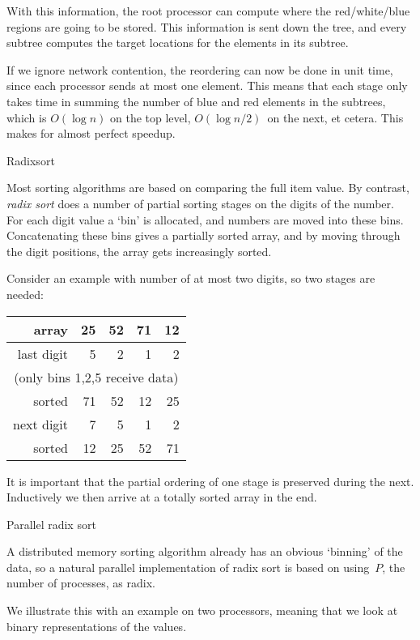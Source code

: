 With this information, the root processor can compute where the
red/white/blue regions are going to be stored. This information is
sent down the tree, and every subtree computes the target locations
for the elements in its subtree.

If we ignore network contention, the reordering can now be done in
unit time, since each processor sends at most one element. This means
that each stage only takes time in summing the number of blue and red
elements in the subtrees, which is $O(\log n)$ on the top level,
$O(\log n/2)$~on the next, et cetera. This makes for almost perfect
speedup.


 {Radixsort}
\label{sec:radixsort}

Most sorting algorithms are based on comparing the full item value. By
contrast, \emph{radix sort} does a number of partial sorting stages on
the digits of the number. For each digit value a `bin' is allocated,
and numbers are moved into these bins. Concatenating these bins gives
a partially sorted array, and by moving through the digit
positions, the array gets increasingly sorted.

Consider an example with number of at most two digits, so two stages
are needed:

\begin{tabular}{rrrrr}
  \midrule
  array     & 25&52&71&12\\
  \midrule
  last digit&  5& 2& 1& 2\\
  \multicolumn{5}{c}{(only bins 1,2,5 receive data)}\\
  sorted    & 71&52&12&25\\
  next digit&  7& 5& 1& 2\\
  sorted    & 12&25&52&71\\
  \midrule
\end{tabular}

It is important that the partial ordering of one stage is preserved
during the next. Inductively we then arrive at a totally sorted array
in the end.

 {Parallel radix sort}

A distributed memory sorting algorithm already has an obvious
`binning' of the data, so a natural parallel implementation of radix
sort is based on using~$P$, the number of processes, as radix.

We illustrate this with an example on two processors, meaning that we
look at binary representations of the values.

